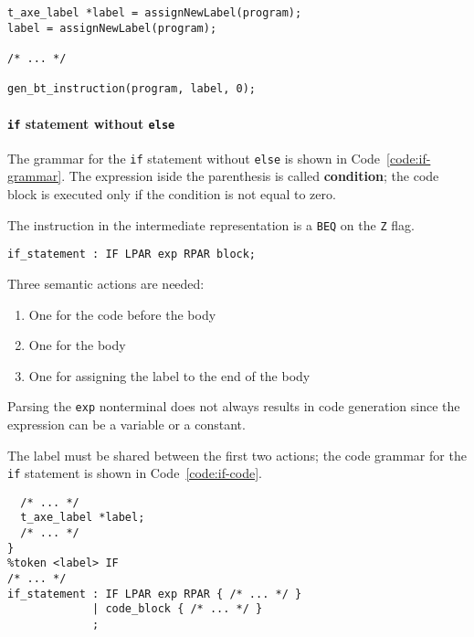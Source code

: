 \begin{onepage}
  \begin{lstlisting}[language=LANCE, caption={Creating backward labels}, label={code:backward-labels}]
t_axe_label *label = assignNewLabel(program);
label = assignNewLabel(program);

/* ... */

gen_bt_instruction(program, label, 0);
\end{lstlisting}
\end{onepage}

\paragraph{\texttt{if} statement without \texttt{else}}

The grammar for the \texttt{if} statement without \texttt{else} is shown in Code~\ref{code:if-grammar}.
The expression iside the parenthesis is called \textbf{condition};
the code block is executed only if the condition is not equal to zero.

The instruction in the intermediate representation is a \texttt{BEQ} on the \texttt{Z} flag.

\begin{onepage}
  \begin{lstlisting}[language=LANCE, caption={Grammar for the if statement}, label={code:if-grammar}]
if_statement : IF LPAR exp RPAR block;
\end{lstlisting}
\end{onepage}

Three semantic actions are needed:

\begin{enumerate}
  \item One for the code before the body
  \item One for the body
  \item One for assigning the label to the end of the body
\end{enumerate}

Parsing the \texttt{exp} nonterminal does not always results in code generation since the expression can be a variable or a constant.

The label must be shared between the first two actions; the code grammar for the \texttt{if} statement is shown in Code~\ref{code:if-code}.

\begin{onepage}
  \begin{lstlisting}[language=LANCE, caption={Code for the if statement}, label={code:if-code}]
%union {
  /* ... */
  t_axe_label *label;
  /* ... */
}
%token <label> IF
/* ... */
if_statement : IF LPAR exp RPAR { /* ... */ }
             | code_block { /* ... */ }
             ;
\end{lstlisting}
\end{onepage}

